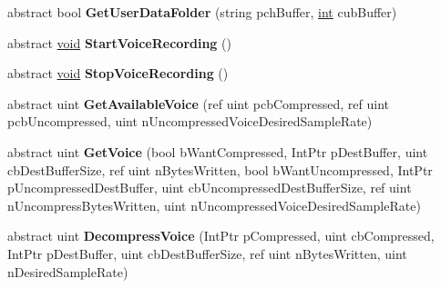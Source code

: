 \begin{DoxyCompactItemize}
\item 
\hypertarget{classValve_1_1Steamworks_1_1ISteamUser_a57163b1abae9de4e23dbb2de9ac82954}{}abstract bool {\bfseries Get\+User\+Data\+Folder} (string pch\+Buffer, \hyperlink{SDL__thread_8h_a6a64f9be4433e4de6e2f2f548cf3c08e}{int} cub\+Buffer)\label{classValve_1_1Steamworks_1_1ISteamUser_a57163b1abae9de4e23dbb2de9ac82954}

\item 
\hypertarget{classValve_1_1Steamworks_1_1ISteamUser_a06b25883eaf14b74baac82a5cc1267ba}{}abstract \hyperlink{SDL__audio_8h_a52835ae37c4bb905b903cbaf5d04b05f}{void} {\bfseries Start\+Voice\+Recording} ()\label{classValve_1_1Steamworks_1_1ISteamUser_a06b25883eaf14b74baac82a5cc1267ba}

\item 
\hypertarget{classValve_1_1Steamworks_1_1ISteamUser_a5dda1c2673d924716fe8a7ba4546ce32}{}abstract \hyperlink{SDL__audio_8h_a52835ae37c4bb905b903cbaf5d04b05f}{void} {\bfseries Stop\+Voice\+Recording} ()\label{classValve_1_1Steamworks_1_1ISteamUser_a5dda1c2673d924716fe8a7ba4546ce32}

\item 
\hypertarget{classValve_1_1Steamworks_1_1ISteamUser_a39875c4b7af7092ce5cc3b741253fb62}{}abstract uint {\bfseries Get\+Available\+Voice} (ref uint pcb\+Compressed, ref uint pcb\+Uncompressed, uint n\+Uncompressed\+Voice\+Desired\+Sample\+Rate)\label{classValve_1_1Steamworks_1_1ISteamUser_a39875c4b7af7092ce5cc3b741253fb62}

\item 
\hypertarget{classValve_1_1Steamworks_1_1ISteamUser_a4f59a157dd72b2c7d1f0d768b4ce3fdf}{}abstract uint {\bfseries Get\+Voice} (bool b\+Want\+Compressed, Int\+Ptr p\+Dest\+Buffer, uint cb\+Dest\+Buffer\+Size, ref uint n\+Bytes\+Written, bool b\+Want\+Uncompressed, Int\+Ptr p\+Uncompressed\+Dest\+Buffer, uint cb\+Uncompressed\+Dest\+Buffer\+Size, ref uint n\+Uncompress\+Bytes\+Written, uint n\+Uncompressed\+Voice\+Desired\+Sample\+Rate)\label{classValve_1_1Steamworks_1_1ISteamUser_a4f59a157dd72b2c7d1f0d768b4ce3fdf}

\item 
\hypertarget{classValve_1_1Steamworks_1_1ISteamUser_ac9b710ab3abc47b2ef716bba4b3a70cd}{}abstract uint {\bfseries Decompress\+Voice} (Int\+Ptr p\+Compressed, uint cb\+Compressed, Int\+Ptr p\+Dest\+Buffer, uint cb\+Dest\+Buffer\+Size, ref uint n\+Bytes\+Written, uint n\+Desired\+Sample\+Rate)\label{classValve_1_1Steamworks_1_1ISteamUser_ac9b710ab3abc47b2ef716bba4b3a70cd}


\end{DoxyCompactItemize}
